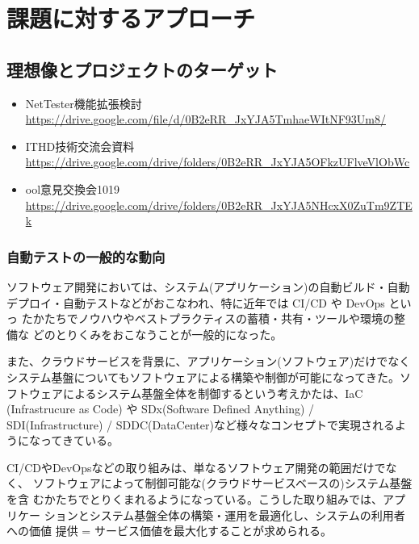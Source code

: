 
\chapter{課題に対するアプローチ}
\label{chap:approach}

 \section{理想像とプロジェクトのターゲット}
 \label{sec:desiredandtarget}


\begin{itemize}
 \item NetTester機能拡張検討 \url{https://drive.google.com/file/d/0B2eRR_JxYJA5TmhaeWItNF93Um8/}
 \item ITHD技術交流会資料 \url{https://drive.google.com/drive/folders/0B2eRR_JxYJA5OFkzUFlveVlObWc}
 \item ool意見交換会1019 \url{https://drive.google.com/drive/folders/0B2eRR_JxYJA5NHcxX0ZuTm9ZTEk}
\end{itemize}

  \subsection{自動テストの一般的な動向}

ソフトウェア開発においては、システム(アプリケーション)の自動ビルド・自動
デプロイ・自動テストなどがおこなわれ、特に近年では CI/CD や DevOps といっ
たかたちでノウハウやベストプラクティスの蓄積・共有・ツールや環境の整備な
どのとりくみをおこなうことが一般的になった。

また、クラウドサービスを背景に、アプリケーション(ソフトウェア)だけでなく
システム基盤についてもソフトウェアによる構築や制御が可能になってきた。ソ
フトウェアによるシステム基盤全体を制御するという考えかたは、IaC
(Infrastrucure as Code) や SDx(Software Defined Anything) /
SDI(Infrastructure) / SDDC(DataCenter)など様々なコンセプトで実現されるよ
うになってきている。

CI/CDやDevOpsなどの取り組みは、単なるソフトウェア開発の範囲だけでなく、
ソフトウェアによって制御可能な(クラウドサービスベースの)システム基盤を含
むかたちでとりくまれるようになっている。こうした取り組みでは、アプリケー
ションとシステム基盤全体の構築・運用を最適化し、システムの利用者への価値
提供 = サービス価値を最大化することが求められる。

